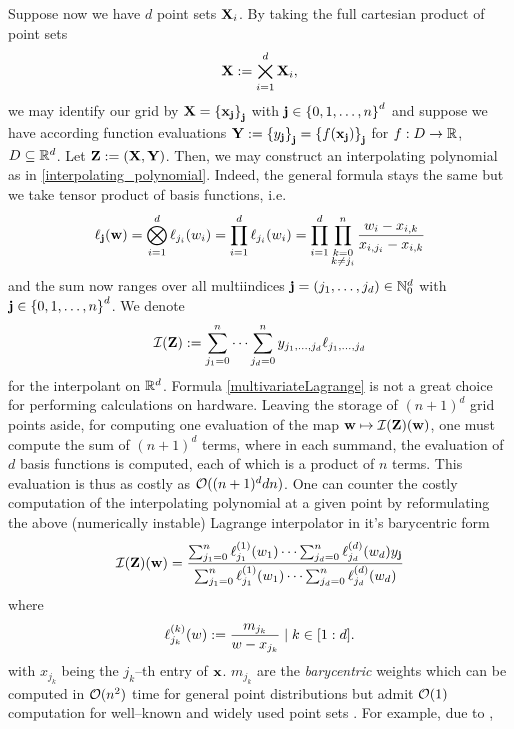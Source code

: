 \documentclass[12pt, oneside]{amsart}
\theoremstyle{definition}
\theoremstyle{remark}
\numberwithin{equation}{section}
\begin{document}
Suppose now we have \(d\) point sets \(\XX_i\). By taking the full cartesian product of point sets \[
    \XX \defn \bigtimes_{i=1}^d \XX_i,
\] we may identify our grid by \(\XX = \set{\bfx_\bfj}_{\bfj}\) with \(\bfj \in \set{0,1,\dots,n}^d\) and suppose we have according function evaluations \(\YY \defn \set{y_\bfj}_\bfj = \set{f(\bfx_\bfj)}_\bfj\) for \(f: D \to \R\), \(D \subseteq \R^d\). Let \(\ZZ \defn (\XX, \YY)\). Then, we may construct an interpolating polynomial as in \cref{interpolating_polynomial}. Indeed, the general formula stays the same but we take tensor product of basis functions, i.e. \begin{equation}\label{multivariateLagrange}
    \ell_\bfj(\bfw) = \bigotimes_{i=1}^d \ell_{j_i}(w_i) = \prod_{i=1}^d \ell_{j_i}(w_i) = \prod_{i=1}^d \prod_{\substack{k=0 \\ k \neq j_i}}^n \frac{w_i - x_{i, k}}{x_{i, j_i} - x_{i, k}}
\end{equation}
and the sum now ranges over all multiindices \(\bfj = (j_1, \dots, j_d) \in \N_0^d\) with \(\bfj \in \set{0, 1, \dots, n}^d\). We denote \begin{equation}\label{eq:interpolantdD}
	\cI(\ZZ) \defn \sum_{j_1 = 0}^n \cdots \sum_{j_d = 0}^n y_{j_1, \dots, j_d} \ell_{j_1, \dots, j_d}
\end{equation}
for the interpolant on \(\R^d\).
Formula \ref{multivariateLagrange} is not a great choice for performing calculations on hardware. Leaving the storage of \((n+1)^d\) grid points aside, for computing one evaluation of the map \(\bfw \mapsto \cI(\ZZ)(\bfw)\), one must compute the sum of \((n+1)^d\) terms, where in each summand, the evaluation of \(d\) basis functions is computed, each of which is a product of \(n\) terms. This evaluation is thus as costly as \(\cO((n+1)^d d n)\). One can counter the costly computation of the interpolating polynomial at a given point by reformulating the above (numerically instable) Lagrange interpolator in it's barycentric form
\begin{equation}\label{eq:multivarBarycentric}
    \cI(\ZZ)(\bfw) = \frac{\sum_{j_1=0}^{n} \ell^{(1)}_{j_1}(w_1) \cdots \sum_{j_d=0}^{n} \ell^{(d)}_{j_d}(w_d) y_\bfj}{\sum_{j_1=0}^{n} \ell^{(1)}_{j_1}(w_1) \cdots \sum_{j_d=0}^{n} \ell^{(d)}_{j_d}(w_d)}
\end{equation}
where
\begin{equation}\label{eq:barycentricBasis}
    \ell^{(k)}_{j_k}(w) \defn \frac{m_{j_k}}{w-x_{j_k}} \mid k \in \indexset[1]{d}.
\end{equation}
with \(x_{j_k}\) being the \(j_k\)--th entry of \(\bfx\). \(m_{j_k}\) are the \emph{barycentric} weights which can be computed in \(\cO(n^2)\) time for general point distributions but admit \(\cO(1)\) computation for well--known and widely used point sets \cite{klimke2004}. For example, due to \cite{Berut_2004},
\end{document}

